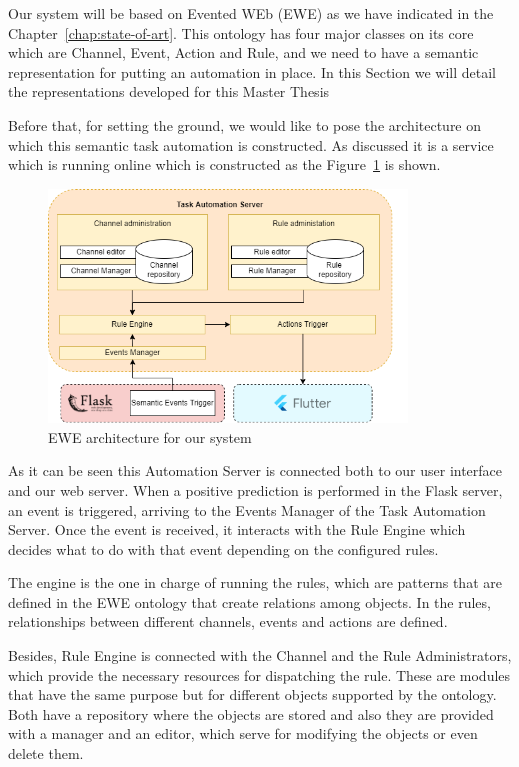 Our system will be based on Evented WEb (EWE) as we have indicated in the Chapter~\ref{chap:state-of-art}. This ontology has four major classes on its core which are Channel, Event, Action and Rule, and we need to have a semantic representation for putting an automation in place. In this Section we will detail the representations developed for this Master Thesis

Before that, for setting the ground, we would like to pose the architecture on which this semantic task automation is constructed. As discussed it is a service which is running online which is constructed as the Figure~\ref{fig:ewearchitecure} is shown.

\begin{figure}[h]
    \centering
    \includegraphics[width=0.85\textwidth]{img/architecture/EWEarchitecture.png}
    \caption{EWE architecture for our system}
    \label{fig:ewearchitecure}
\end{figure}

As it can be seen this Automation Server is connected both to our user interface and our web server. When a positive prediction is performed in the Flask server, an event is triggered, arriving to the Events Manager of the Task Automation Server. Once the event is received, it interacts with the Rule Engine which decides what to do with that event depending on the configured rules.

The engine is the one in charge of running the rules, which are patterns that are defined in the EWE ontology that create relations among objects. In the rules, relationships between different channels, events and actions are defined.

Besides, Rule Engine is connected with the Channel and the Rule Administrators, which provide the necessary resources for dispatching the rule. These are modules that have the same purpose but for different objects supported by the ontology. Both have a repository where the objects are stored and also they are provided with a manager and an editor, which serve for modifying the objects or even delete them.

